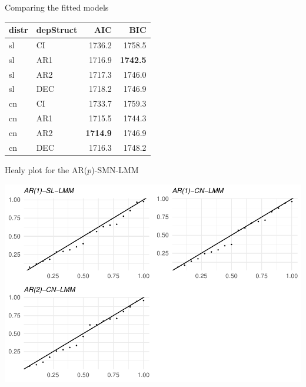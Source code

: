 \begin{frame}{Comparing the fitted models}
\protect\hypertarget{comparing-the-fitted-models-1}{}

\begin{longtable}[]{@{}llrr@{}}
\toprule
distr & depStruct & AIC & BIC\tabularnewline
\midrule
\endhead
sl & CI & 1736.2 & 1758.5\tabularnewline
sl & AR1 & 1716.9 & \bf 1742.5\tabularnewline
sl & AR2 & 1717.3 & 1746.0\tabularnewline
sl & DEC & 1718.2 & 1746.9\tabularnewline
cn & CI & 1733.7 & 1759.3\tabularnewline
cn & AR1 & 1715.5 & 1744.3\tabularnewline
cn & AR2 & \bf 1714.9 & 1746.9\tabularnewline
cn & DEC & 1716.3 & 1748.2\tabularnewline
\bottomrule
\end{longtable}

\end{frame}

\begin{frame}[fragile]{Healy plot for the AR(\(p\))-SMN-LMM}
\protect\hypertarget{healy-plot-for-the-arp-smn-lmm}{}

\scriptsize

\begin{Shaded}
\begin{Highlighting}[]
\NormalTok{(}
            \NormalTok{)}
\end{Highlighting}
\end{Shaded}

\begin{center}\includegraphics[width=0.75\linewidth]{codes_files/figure-beamer/healy2-1} \end{center}

\end{frame}


